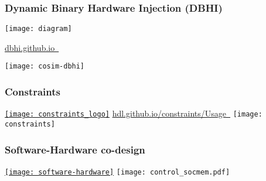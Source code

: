 \documentclass[xcolor={usenames,dvipsnames}]{beamer}
\begin{document}
  \begin{frame}
  \frametitle{Dynamic Binary Hardware Injection (DBHI)}
  \centering
  \texttt{[image: diagram]}

  \vfill
  \Large\href{https://dbhi.github.io/}{dbhi.github.io~\faGlobe}

  \vfill
  \texttt{[image: cosim-dbhi]}
\end{frame}

\begin{frame}
  \frametitle{Constraints}
  \centering
  \href{https://hdl.github.io/constraints/Usage.html}{\texttt{[image: constraints\_logo]}}
  \vfill
  \Large\href{https://hdl.github.io/constraints/Usage.html}{hdl.github.io/constraints/Usage~\faBook}
  \vfill
  \texttt{[image: constraints]}
\end{frame}

\begin{frame}
  \frametitle{Software-Hardware co-design}
  \centering
  \href{https://umarcor.github.io/SIEAV/Co-design.html}{\texttt{[image: software-hardware]}}
  \vfill
  \texttt{[image: control\_socmem.pdf]}
\end{frame}
\end{document}
